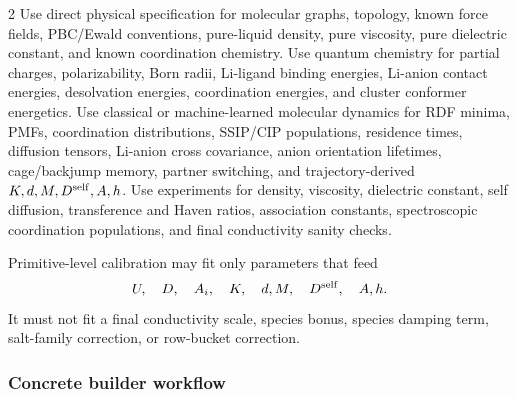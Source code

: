\documentclass[10pt]{article}
\begin{document}
\begin{multicols}{2}
Use direct physical specification for molecular graphs, topology, known force
fields, PBC/Ewald conventions, pure-liquid density, pure viscosity, pure
dielectric constant, and known coordination chemistry. Use quantum chemistry
for partial charges, polarizability, Born radii, Li-ligand binding energies,
Li-anion contact energies, desolvation energies, coordination energies, and
cluster conformer energetics. Use classical or machine-learned molecular
dynamics for RDF minima, PMFs, coordination distributions, SSIP/CIP
populations, residence times, diffusion tensors, Li-anion cross covariance,
anion orientation lifetimes, cage/backjump memory, partner switching, and
trajectory-derived \(K,d,M,D^{\rm self},A,h\). Use experiments for density,
viscosity, dielectric constant, self diffusion, transference and Haven ratios,
association constants, spectroscopic coordination populations, and final
conductivity sanity checks.

Primitive-level calibration may fit only parameters that feed
\[
U,\quad D,\quad A_i,\quad K,\quad d,M,\quad D^{\rm self},\quad A,h.
\]
It must not fit a final conductivity scale, species bonus, species damping
term, salt-family correction, or row-bucket correction.

\subsubsection{Concrete builder workflow}


\end{multicols}
\end{document}
